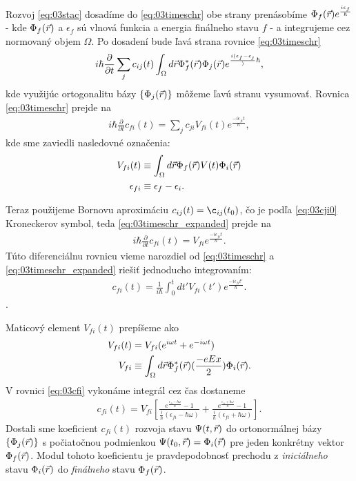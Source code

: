 Rozvoj \eqref{eq:03stac} dosadíme do \eqref{eq:03timeschr} obe strany prenásobíme $\Phi_f(\vec{r})e^{\frac{i\epsilon_f}{\hbar}}$ - kde $\Phi_f(\vec{r})$ a $\epsilon_f$ sú vlnová funkcia a energia finálneho stavu $f$ - a integrujeme cez normovaný objem $\Omega$. Po dosadení bude ľavá strana rovnice \eqref{eq:03timeschr} 
\begin{align}
i\hbar\frac{\partial}{\partial t} \sum_j c_{ij}(t)\int_{\Omega} d\vec{r} \Phi_f^{*}(\vec{r})\Phi_j(\vec{r})e^{\frac{i(\epsilon_f-\epsilon_j}){\hbar}} \text{,}
\end{align}
kde využijúc ortogonalitu bázy $\{\Phi_j(\vec{r})\}$ môžeme ľavú stranu vysumovať. Rovnica \eqref{eq:03timeschr} prejde na 
\begin{align}
\label{eq:03timeschr_expanded}
i\hbar\frac{\partial}{\partial t}c_{fi}(t)=\sum_j c_{ji} V_{fi}(t)e^{\frac{-i \epsilon_{fi} t}{\hbar}} \mathrm{,}
\end{align}
kde sme zaviedli nasledovné označenia:
\begin{align}
V_{fi}(t) &\equiv \int_{\Omega}d\vec{r} \Phi_f(\vec{r})V(t)\Phi_i(\vec{r}) \\
\epsilon_{fi} &\equiv \epsilon_f - \epsilon_i \text{.}
\end{align}

Teraz použijeme Bornovu aproximáciu $c_{ij}(t)=\c_{ij}(t_0)$, čo je podľa \eqref{eq:03cji0} Kroneckerov symbol, teda \eqref{eq:03timeschr_expanded} prejde na
\begin{align}
\label{eq:03born_appr}
i\hbar\frac{\partial}{\partial t}c_{fi}(t)=V_{fi}e^{\frac{-i\epsilon_{fi} t}{\hbar}}\mathrm{.}
\end{align}
Túto diferenciálnu rovnicu vieme narozdiel od \eqref{eq:03timeschr} a \eqref{eq:03timeschr_expanded} riešiť jednoducho integrovaním:
\begin{align}
\label{eq:03cfi}
c_{fi}(t) = \frac{1}{i\hbar} \int_0^t dt' V_{fi}(t')e^{\frac{-i\epsilon_{fi} t'}{\hbar}} \text{.}
\end{align}.

Maticový element $V_{fi}(t)$ prepíšeme ako
\begin{align}
V_{fi}(t)&=V_{fi}(e^{i\omega t}+e^{-i\omega t})\\
\label{eq:03Vfi}
V_{fi}&\equiv \int_{\Omega} d\vec{r} \Phi_f^{*}(\vec{r})(\frac{-eEx}{2})\Phi_i(\vec{r}) \text{.}
\end{align}
V rovnici \eqref{eq:03cfi} vykonáme integrál cez čas dostaneme
\begin{align}
\label{eq:03cfi_final}
c_{fi}(t)=V_{fi}[\frac{e^{\frac{\epsilon_{fi} - \hbar\omega}{\hbar}}-1}{\frac{i}{\hbar}(\epsilon_{fi}-\hbar\omega)}+\frac{e^{\frac{\epsilon_{fi} + \hbar\omega}{\hbar}}-1}{\frac{i}{\hbar}(\epsilon_{fi}+\hbar\omega)}] \text{.}
\end{align}
Dostali sme koeficient $c_{fi}(t)$ rozvoja  stavu $\Psi(t,\vec{r})$ do ortonormálnej bázy $\{\Phi_j(\vec{r})\}$ s počiatočnou podmienkou $\Psi(t_0,\vec{r})=\Phi_i(\vec{r})$ pre jeden konkrétny vektor $\Phi_f(\vec{r})$. Modul tohoto koeficientu je pravdepodobnosť prechodu z {\it iniciálneho} stavu $\Phi_i(\vec{r})$ do {\it finálneho} stavu $\Phi_f(\vec{r})$.

